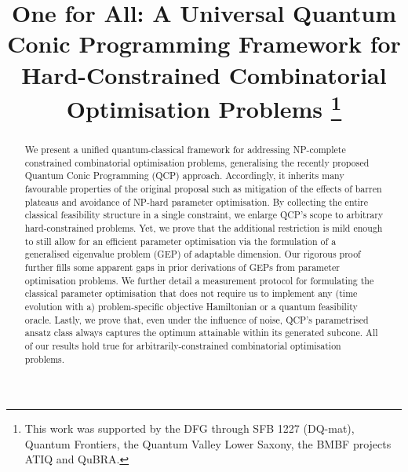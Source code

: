 \documentclass[10pt,conference]{IEEEtran}
\begin{document}
\title{
    One for All: A Universal Quantum Conic Programming Framework for Hard-Constrained Combinatorial Optimisation Problems
    \thanks{This work was supported by the DFG through SFB 1227 (DQ-mat), Quantum Frontiers, the Quantum Valley Lower Saxony, the BMBF projects ATIQ and QuBRA.}
}

\author{
}

\maketitle

\begin{abstract}
    We present a unified quantum-classical framework for addressing NP-complete constrained combinatorial optimisation problems, generalising the recently proposed Quantum Conic Programming (QCP) approach.
    Accordingly, it inherits many favourable properties of the original proposal such as mitigation of the effects of barren plateaus and avoidance of NP-hard parameter optimisation.
    By collecting the entire classical feasibility structure in a single constraint, we enlarge QCP's scope to arbitrary hard-constrained problems.
    Yet, we prove that the additional restriction is mild enough to still allow for an efficient parameter optimisation via the formulation of a generalised eigenvalue problem (GEP) of adaptable dimension.
    Our rigorous proof further fills some apparent gaps in prior derivations of GEPs from parameter optimisation problems.
    We further detail a measurement protocol for formulating the classical parameter optimisation that does not require us to implement any (time evolution with a) problem-specific objective Hamiltonian or a quantum feasibility oracle.
    Lastly, we prove that, even under the influence of noise, QCP's parametrised ansatz class always captures the optimum attainable within its generated subcone.
    All of our results hold true for arbitrarily-constrained combinatorial optimisation problems.
\end{abstract}
\end{document}
